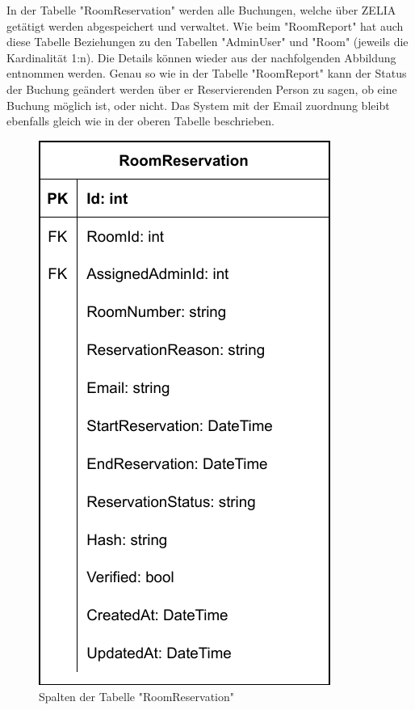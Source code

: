 
In der Tabelle "RoomReservation" werden alle Buchungen, welche über ZELIA getätigt werden abgespeichert und verwaltet. Wie beim "RoomReport" hat auch diese Tabelle Beziehungen zu den Tabellen "AdminUser" und "Room" (jeweils die Kardinalität 1:n). Die Details können wieder aus der nachfolgenden Abbildung entnommen werden. Genau so wie in der Tabelle "RoomReport" kann der Status der Buchung geändert werden über er Reservierenden Person zu sagen, ob eine Buchung möglich ist, oder nicht. Das System mit der Email zuordnung bleibt ebenfalls gleich wie in der oberen Tabelle beschrieben.

\begin{figure}[H]
    \centering
    \includegraphics{media/MariaDB/RoomReservation.svg.pdf}
    \caption{Spalten der Tabelle "RoomReservation"}
\end{figure}


